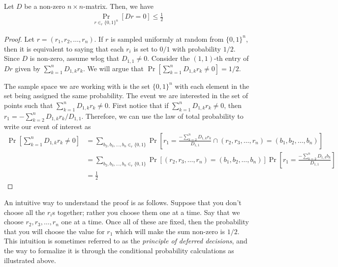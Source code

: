 \begin{lemma}
	Let $D$ be a non-zero $n\times n$-matrix. Then, we have
	\begin{align*}
		\Pr_{r \in_r \{0,1\}^n} [Dr = 0] \leq \frac{1}{2}
	\end{align*}
	\label{lem:matr-ver}
\end{lemma}
\begin{proof}
	Let $r=(r_1, r_2, \ldots, r_n)$. If $r$ is sampled uniformly at random from $\{0,1\}^n$, then it is equivalent to saying that each $r_i$ is set to $0/1$ with probability $1/2$. Since $D$ is non-zero, assume wlog that $D_{1,1} \neq 0$. Consider the $(1,1)$-th entry of $Dr$ given by $\sum_{k=1}^n D_{1,k} r_k$. We will argue that $\Pr[\sum_{k=1}^n D_{1,k} r_k \neq 0] = 1/2$. 
	
	The sample space we are working with is the set $\{0,1\}^n$ with each element in the set being assigned the same probability. The event we are interested in the set of points such that $\sum_{k=1}^n D_{1,k}r_k \neq 0$. First notice that if $\sum_{k=1}^n D_{1,k}r_k \neq 0$, then $r_1 = -\sum_{k=2}^n D_{1,k}r_k/D_{1,1}$. Therefore, we can use the law of total probability to write our event of interest as 
	\begin{align*}
		\Pr[\sum_{k=1}^n D_{1,k} r_k \neq 0] &= \sum_{b_2, b_3, \ldots, b_n \in_r \{0,1\}} \Pr\left[ r_1 = \frac{-\sum_{k=2}^n D_{1,k}r_k}{D_{1,1}} \cap (r_2, r_3, \ldots, r_n) = (b_1, b_2, \ldots, b_n) \right]\\
		&= \sum_{b_2, b_3, \ldots, b_n \in_r \{0,1\}} \Pr\left[ (r_2, r_3, \ldots, r_n) = (b_1, b_2, \ldots, b_n) \right] \Pr\left[ r_1 = \frac{-\sum_{k=2}^n D_{1,k}b_k}{D_{1,1}} \right]\\
		&= \frac{1}{2}
	\end{align*}
\end{proof}

An intuitive way to understand the proof is as follows. Suppose that you don't choose all the $r_i$s together; rather you choose them one at a time. Say that we choose $r_2, r_3, \ldots, r_n$ one at a time. Once all of these are fixed, then the probability that you will choose the value for $r_1$ which will make the sum non-zero is $1/2$. This intuition is sometimes referred to as the \textit{principle of deferred decisions}, and the way to formalize it is through the conditional probability calculations as illustrated above.

